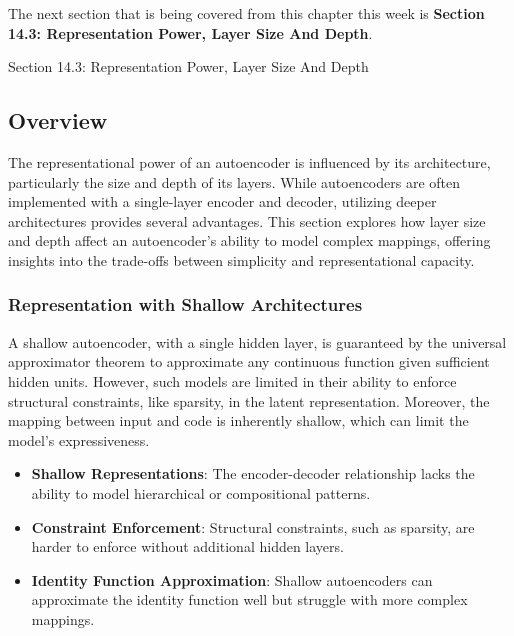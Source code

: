 The next section that is being covered from this chapter this week is \textbf{Section 14.3: Representation Power, Layer Size And Depth}.

\begin{notes}{Section 14.3: Representation Power, Layer Size And Depth}
    \subsection*{Overview}

    The representational power of an autoencoder is influenced by its architecture, particularly the size and depth of its layers. While autoencoders are often implemented with a single-layer encoder and 
    decoder, utilizing deeper architectures provides several advantages. This section explores how layer size and depth affect an autoencoder's ability to model complex mappings, offering insights into the 
    trade-offs between simplicity and representational capacity.
    
    \subsubsection*{Representation with Shallow Architectures}
    
    A shallow autoencoder, with a single hidden layer, is guaranteed by the universal approximator theorem to approximate any continuous function given sufficient hidden units. However, such models are 
    limited in their ability to enforce structural constraints, like sparsity, in the latent representation. Moreover, the mapping between input and code is inherently shallow, which can limit the model's 
    expressiveness.
    
    \begin{highlight}
        \begin{itemize}
            \item \textbf{Shallow Representations}: The encoder-decoder relationship lacks the ability to model hierarchical or compositional patterns.
            \item \textbf{Constraint Enforcement}: Structural constraints, such as sparsity, are harder to enforce without additional hidden layers.
            \item \textbf{Identity Function Approximation}: Shallow autoencoders can approximate the identity function well but struggle with more complex mappings.
        \end{itemize}
    \end{highlight}
    

\end{notes}
